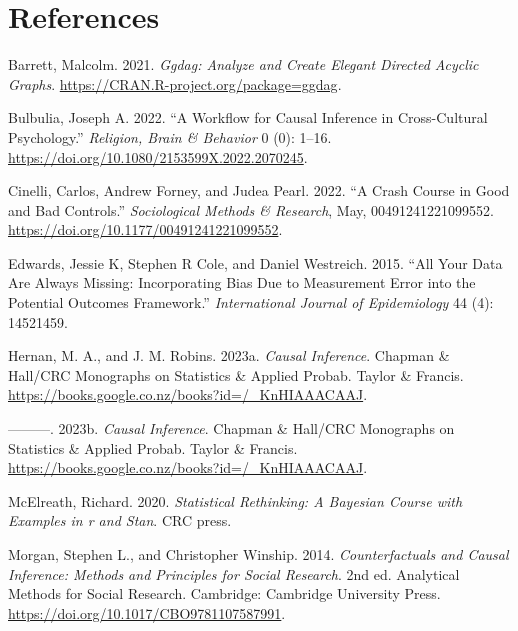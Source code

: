 \documentclass[
  singlecolumn]{report}
\newlength{\cslhangindent}
\newlength{\cslentryspacingunit} %
\newenvironment{CSLReferences}[2] %
 {%
  \setlength{\parindent}{0pt}
  \ifodd #1
  \let\oldpar\par
  \def\par{\hangindent=\cslhangindent\oldpar}
  \fi
  \setlength{\parskip}{#2\cslentryspacingunit}
 }%
 {}
\begin{document}
\hypertarget{references}{%
\section*{References}\label{references}}

\hypertarget{refs}{}
\begin{CSLReferences}{1}{0}
\leavevmode{}%
Barrett, Malcolm. 2021. \emph{Ggdag: Analyze and Create Elegant Directed
Acyclic Graphs}. \url{https://CRAN.R-project.org/package=ggdag}.

\leavevmode{}%
Bulbulia, Joseph A. 2022. {``A Workflow for Causal Inference in
Cross-Cultural Psychology.''} \emph{Religion, Brain \& Behavior} 0 (0):
1--16. \url{https://doi.org/10.1080/2153599X.2022.2070245}.

\leavevmode{}%
Cinelli, Carlos, Andrew Forney, and Judea Pearl. 2022. {``A Crash Course
in Good and Bad Controls.''} \emph{Sociological Methods \& Research},
May, 00491241221099552. \url{https://doi.org/10.1177/00491241221099552}.

\leavevmode{}%
Edwards, Jessie K, Stephen R Cole, and Daniel Westreich. 2015. {``All
Your Data Are Always Missing: Incorporating Bias Due to Measurement
Error into the Potential Outcomes Framework.''} \emph{International
Journal of Epidemiology} 44 (4): 14521459.

\leavevmode{}%
Hernan, M. A., and J. M. Robins. 2023a. \emph{Causal Inference}. Chapman
\& Hall/CRC Monographs on Statistics \& Applied Probab. Taylor \&
Francis. \url{https://books.google.co.nz/books?id=/_KnHIAAACAAJ}.

\leavevmode{}%
---------. 2023b. \emph{Causal Inference}. Chapman \& Hall/CRC
Monographs on Statistics \& Applied Probab. Taylor \& Francis.
\url{https://books.google.co.nz/books?id=/_KnHIAAACAAJ}.

\leavevmode{}%
McElreath, Richard. 2020. \emph{Statistical Rethinking: A Bayesian
Course with Examples in r and Stan}. CRC press.

\leavevmode{}%
Morgan, Stephen L., and Christopher Winship. 2014. \emph{Counterfactuals
and Causal Inference: Methods and Principles for Social Research}. 2nd
ed. Analytical Methods for Social Research. Cambridge: Cambridge
University Press. \url{https://doi.org/10.1017/CBO9781107587991}.


\end{CSLReferences}
\end{document}
